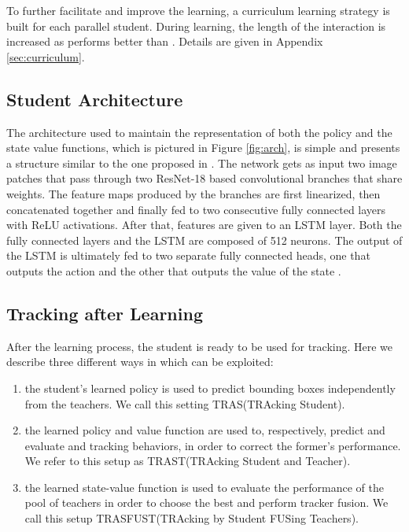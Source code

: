 \documentclass[runningheads]{llncs}
\makeatletter
\def\myalgonamefirst{TRAS\@\xspace}
\def\myalgonamesecond{TRAST\@\xspace}
\def\myalgonamethird{TRASFUST\@\xspace}
\makeatother
\begin{document}
To further facilitate and improve the learning, a curriculum learning strategy \cite{Bengio2009} is built for each parallel student. During learning, the length of the interaction is increased as  performs better than . Details are given in Appendix \ref{sec:curriculum}.

\subsection{Student Architecture}
The architecture used to maintain the representation of both the policy  and the state value  functions, which is pictured in Figure \ref{fig:arch}, is simple and presents a structure similar to the one proposed in \cite{GOTURN,RE3}. 
The network gets as input two image patches that pass through two ResNet-18 based \cite{He2016ResNet} convolutional branches that share weights. The feature maps produced by the branches are first linearized, then concatenated together and finally fed to two consecutive fully connected layers with ReLU activations. After that, features are given to an LSTM \cite{Hochreiter1997LSTM} layer. Both the fully connected layers and the LSTM are composed of 512 neurons. The output of the LSTM is ultimately fed to two separate fully connected heads, one that outputs the action  and the other that outputs the value of the state .


\subsection{Tracking after Learning}
After the learning process, the student  is ready to be used for tracking. Here we describe three different ways in which  can be exploited:
\begin{enumerate}
    \item the student's learned policy  is used to predict bounding boxes  independently from the teachers. We call this setting \myalgonamefirst (TRAcking Student).
    \item the learned policy  and value function  are used to, respectively, predict  and evaluate  and  tracking behaviors, in order to correct the former's performance. We refer to this setup as \myalgonamesecond (TRAcking Student and Teacher).
    \item the learned state-value function  is used to evaluate the performance of the pool of teachers  in order to choose the best  and perform tracker fusion. We call this setup \myalgonamethird (TRAcking by Student FUSing Teachers).
\end{enumerate}
\end{document}
